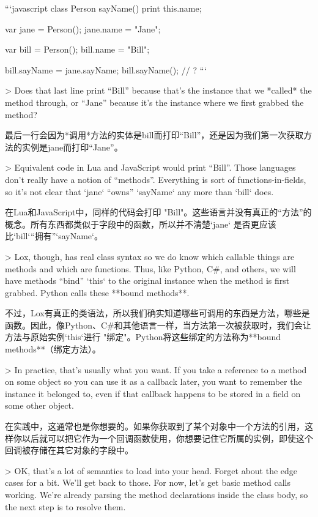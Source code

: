 \documentclass[cn,11pt,chinese]{elegantbook}
\begin{document}
{{{{{{{{{{{{{{{{{{{{```javascript
class Person {
  sayName() {
    print this.name;
  }
}

var jane = Person();
jane.name = "Jane";

var bill = Person();
bill.name = "Bill";

bill.sayName = jane.sayName;
bill.sayName(); // ?
```

> Does that last line print “Bill” because that’s the instance that we *called* the method through, or “Jane” because it’s the instance where we first grabbed the method?

最后一行会因为*调用*方法的实体是bill而打印“Bill”，还是因为我们第一次获取方法的实例是jane而打印“Jane”。

> Equivalent code in Lua and JavaScript would print “Bill”. Those languages don’t really have a notion of “methods”. Everything is sort of functions-in-fields, so it’s not clear that `jane` “owns” `sayName` any more than `bill` does.

在Lua和JavaScript中，同样的代码会打印 "Bill"。这些语言并没有真正的“方法”的概念。所有东西都类似于字段中的函数，所以并不清楚`jane` 是否更应该比`bill`“拥有”`sayName`。

> Lox, though, has real class syntax so we do know which callable things are methods and which are functions. Thus, like Python, C#, and others, we will have methods “bind” `this` to the original instance when the method is first grabbed. Python calls these **bound methods**.

不过，Lox有真正的类语法，所以我们确实知道哪些可调用的东西是方法，哪些是函数。因此，像Python、C#和其他语言一样，当方法第一次被获取时，我们会让方法与原始实例`this`进行 "绑定"。Python将这些绑定的方法称为**bound methods**（绑定方法）。

> In practice, that’s usually what you want. If you take a reference to a method on some object so you can use it as a callback later, you want to remember the instance it belonged to, even if that callback happens to be stored in a field on some other object.

在实践中，这通常也是你想要的。如果你获取到了某个对象中一个方法的引用，这样你以后就可以把它作为一个回调函数使用，你想要记住它所属的实例，即使这个回调被存储在其它对象的字段中。

> OK, that’s a lot of semantics to load into your head. Forget about the edge cases for a bit. We’ll get back to those. For now, let’s get basic method calls working. We’re already parsing the method declarations inside the class body, so the next step is to resolve them.

}}}}}}}}}}}}}}}}}}}}
\end{document}
